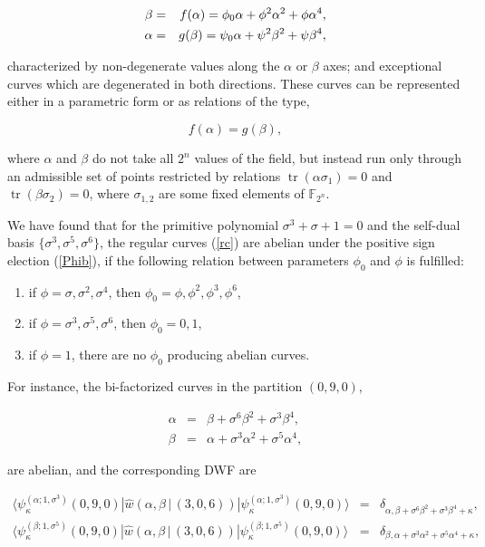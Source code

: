 \documentclass[quantumrep,article,submit,pdftex,moreauthors]{Definitions/mdpi}
\DeclareMathOperator{\tr}{tr}
\begin{document}
\begin{eqnarray}
  \beta &=& f(\alpha) = \phi_{0}\alpha +\phi^{2} \alpha^{2} + \phi \alpha^{4},
  \label{rc} \\
  \alpha &=& g(\beta) = \psi_{0}\alpha +\psi^{2} \beta^{2} + \psi \beta^{4}, 
  \notag
\end{eqnarray}

characterized by non-degenerate values along the $\alpha$ or $\beta$ axes; and
exceptional curves which are degenerated in both directions. These curves
can be represented either in a parametric form or as relations of the type,

\begin{equation*}
  f(\alpha) = g(\beta),
\end{equation*}

where $\alpha$ and $\beta$ do not take all $2^{n}$ values of the field, but
instead run only through an admissible set of points restricted by relations $
\tr(\alpha \sigma_{1}) = 0$ and $\tr(\beta \sigma_{2}) = 0$, where
$\sigma_{1,2}$ are some fixed elements of $\mathbb{F}_{2^{n}}$.

We have found that for the primitive polynomial $\sigma^{3} + \sigma + 1 = 0$
and the self-dual basis $\{\sigma^{3},\sigma^{5},\sigma^{6}\}$, the regular
curves (\ref{rc}) are abelian under the positive sign election (\ref{Phib}), if
the following relation between parameters $\phi_{0}$ and $\phi$ is fulfilled:

\begin{enumerate}
  \item if $\phi =\sigma, \sigma^{2}, \sigma^{4}$, then $\phi_{0} =
    \phi,\phi^{2},\phi^{3}, \phi^{6}$,
  \item if $\phi = \sigma^{3}, \sigma^{5}, \sigma^{6}$, then $\phi_{0}=0,1$,
  \item if $\phi = 1$, there are no $\phi_{0}$ producing abelian curves.
\end{enumerate}

For instance, the bi-factorized curves in the partition $(0,9,0)$,

\begin{eqnarray}
  \alpha &=& \beta + \sigma^{6} \beta^{2} + \sigma^{3}\beta^{4},
  \label{ac1} \\
  \beta &=& \alpha + \sigma^{3} \alpha^{2} + \sigma^{5}\alpha^{4},
  \label{ac2}
\end{eqnarray}

are abelian, and the corresponding DWF are

\begin{eqnarray*}
  \langle \psi_{\kappa}^{(\alpha ; 1,\sigma^{3})}(0,9,0)
  |\hat{w}\left(\alpha,\beta \, | \, (3,0,6)\right)
  |\psi_{\kappa}^{(\alpha ; 1,\sigma^{3})}(0,9,0)\rangle
  &=& \delta_{\alpha,\beta + \sigma^{6}\beta^{2} + \sigma^{3} \beta^{4} +
  \kappa}, \\
  \langle \psi_{\kappa }^{(\beta ; 1,\sigma^{5})}(0,9,0)
  |\hat{w}\left(\alpha,\beta \, | \, (3,0,6)\right)
  |\psi_{\kappa}^{(\beta ; 1,\sigma^{5})}(0,9,0)\rangle
  &=& \delta_{\beta,\alpha + \sigma^{3}\alpha^{2} + \sigma^{5} \alpha^{4} +
  \kappa },
\end{eqnarray*}
\end{document}
